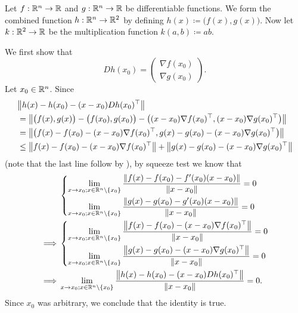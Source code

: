 \begin{eg}\label{ii:6.4.2}
  Let \(f : \R^n \to \R\) and \(g : \R^n \to \R\) be differentiable functions.
  We form the combined function \(h : \R^n \to \R^2\) by defining \(h(x) \coloneqq \big(f(x), g(x)\big)\).
  Now let \(k : \R^2 \to \R\) be the multiplication function \(k(a, b) \coloneqq ab\).

  We first show that
  \[
    D h(x_0) = \begin{pmatrix}
      \nabla f(x_0) \\
      \nabla g(x_0)
    \end{pmatrix}.
  \]
  Let \(x_0 \in \R^n\).
  Since
  \begin{align*}
     & \norm*{h(x) - h(x_0) - (x - x_0) D h(x_0)^\top}                                                                                  \\
     & = \norm*{\big(f(x), g(x)\big) - \big(f(x_0), g(x_0)\big) - \big((x - x_0) \nabla f(x_0)^\top, (x - x_0) \nabla g(x_0)^\top\big)} \\
     & = \norm*{\big(f(x) - f(x_0) - (x - x_0) \nabla f(x_0)^\top, g(x) - g(x_0) - (x - x_0) \nabla g(x_0)^\top\big)}                   \\
     & \leq \norm*{f(x) - f(x_0) - (x - x_0) \nabla f(x_0)^\top} + \norm*{g(x) - g(x_0) - (x - x_0) \nabla g(x_0)^\top}
  \end{align*}
  (note that the last line follow by ),
  by squeeze test we know that
  \begin{align*}
             & \begin{dcases}
                 \lim_{x \to x_0 ; x \in \R^n \setminus \set{x_0}} \dfrac{\norm*{f(x) - f(x_0) - f'(x_0)(x - x_0)}}{\norm*{x - x_0}} = 0 \\
                 \lim_{x \to x_0 ; x \in \R^n \setminus \set{x_0}} \dfrac{\norm*{g(x) - g(x_0) - g'(x_0)(x - x_0)}}{\norm*{x - x_0}} = 0
               \end{dcases} \\
    \implies & \begin{dcases}
                 \lim_{x \to x_0 ; x \in \R^n \setminus \set{x_0}} \dfrac{\norm*{f(x) - f(x_0) - (x - x_0) \nabla f(x_0)^\top}}{\norm*{x - x_0}} = 0 \\
                 \lim_{x \to x_0 ; x \in \R^n \setminus \set{x_0}} \dfrac{\norm*{g(x) - g(x_0) - (x - x_0) \nabla g(x_0)^\top}}{\norm*{x - x_0}} = 0
               \end{dcases} \\
    \implies & \lim_{x \to x_0 ; x \in \R^n \setminus \set{x_0}} \dfrac{\norm*{h(x) - h(x_0) - (x - x_0) D h(x_0)^\top}}{\norm*{x - x_0}} = 0.
  \end{align*}
  Since \(x_0\) was arbitrary, we conclude that the identity is true.


\end{eg}
